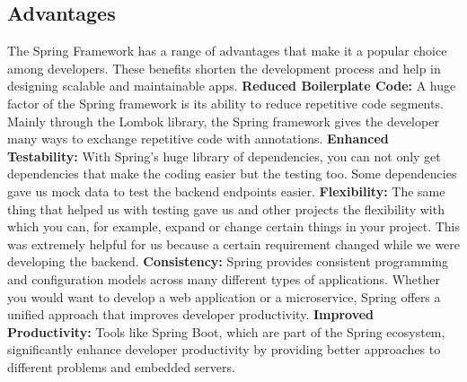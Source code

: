     \subsection{Advantages}
    The Spring Framework has a range of advantages that make it a popular choice among developers. These benefits shorten the development process and help in designing scalable and maintainable apps. \newline \newline
    \textbf{Reduced Boilerplate Code:} \newline 
    A huge factor of the Spring framework is its ability to reduce repetitive code segments. Mainly through the Lombok library, the Spring framework gives the developer many ways to exchange repetitive code with annotations. \newline  \newline
    \textbf{Enhanced Testability:} \newline
    With Spring's huge library of dependencies, you can not only get dependencies that make the coding easier but the testing too. Some dependencies gave us mock data to test the backend endpoints easier.\newline \newline
    \textbf{Flexibility:} \newline
    The same thing that helped us with testing gave us and other projects the flexibility with which you can, for example, expand or change certain things in your project. This was extremely helpful for us because a certain requirement changed while we were developing the backend.\newline \newline
    \textbf{Consistency:} \newline
    Spring provides consistent programming and configuration models across many different types of applications. Whether you would want to develop a web application or a microservice, Spring offers a unified approach that improves developer productivity.\newline \newline
    \textbf{Improved Productivity:} \newline
    Tools like Spring Boot, which are part of the Spring ecosystem, significantly enhance developer productivity by providing better approaches to different problems and embedded servers. \Autocite{Andi:SpringBoot2}
    
    \pagebreak